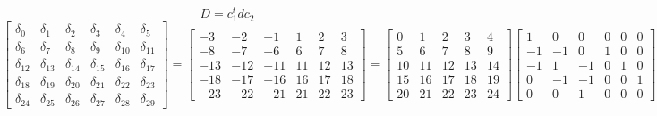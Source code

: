 \documentclass{article}%
\begin{document}
\[%
D = c_1^t d c_2%
\]%
\[%
\left[\begin{matrix}\delta_{0} & \delta_{1} & \delta_{2} & \delta_{3} & \delta_{4} & \delta_{5}\\\delta_{6} & \delta_{7} & \delta_{8} & \delta_{9} & \delta_{10} & \delta_{11}\\\delta_{12} & \delta_{13} & \delta_{14} & \delta_{15} & \delta_{16} & \delta_{17}\\\delta_{18} & \delta_{19} & \delta_{20} & \delta_{21} & \delta_{22} & \delta_{23}\\\delta_{24} & \delta_{25} & \delta_{26} & \delta_{27} & \delta_{28} & \delta_{29}\end{matrix}\right] = \left[\begin{matrix}-3 & -2 & -1 & 1 & 2 & 3\\-8 & -7 & -6 & 6 & 7 & 8\\-13 & -12 & -11 & 11 & 12 & 13\\-18 & -17 & -16 & 16 & 17 & 18\\-23 & -22 & -21 & 21 & 22 & 23\end{matrix}\right] = \left[\begin{matrix}0 & 1 & 2 & 3 & 4\\5 & 6 & 7 & 8 & 9\\10 & 11 & 12 & 13 & 14\\15 & 16 & 17 & 18 & 19\\20 & 21 & 22 & 23 & 24\end{matrix}\right] \left[\begin{matrix}1 & 0 & 0 & 0 & 0 & 0\\-1 & -1 & 0 & 1 & 0 & 0\\-1 & 1 & -1 & 0 & 1 & 0\\0 & -1 & -1 & 0 & 0 & 1\\0 & 0 & 1 & 0 & 0 & 0\end{matrix}\right]%
\]%
\end{document}
